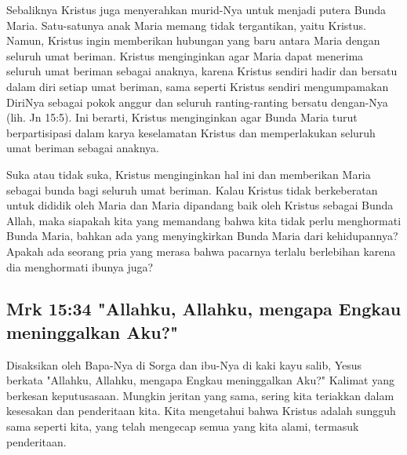 Sebaliknya Kristus juga menyerahkan murid-Nya untuk menjadi putera Bunda Maria.
Satu-satunya anak Maria memang tidak tergantikan, yaitu Kristus. Namun, Kristus
ingin memberikan hubungan yang baru antara Maria dengan seluruh umat beriman.
Kristus menginginkan agar Maria dapat menerima seluruh umat beriman sebagai
anaknya, karena Kristus sendiri hadir dan bersatu dalam diri setiap umat
beriman, sama seperti Kristus sendiri mengumpamakan DiriNya sebagai pokok
anggur dan seluruh ranting-ranting bersatu dengan-Nya (lih. Jn 15:5). Ini
berarti, Kristus menginginkan agar Bunda Maria turut berpartisipasi dalam karya
keselamatan Kristus dan memperlakukan seluruh umat beriman sebagai anaknya.

Suka atau tidak suka, Kristus menginginkan hal ini dan memberikan Maria sebagai
bunda bagi seluruh umat beriman. Kalau Kristus tidak berkeberatan untuk dididik
oleh Maria dan Maria dipandang baik oleh Kristus sebagai Bunda Allah, maka
siapakah kita yang memandang bahwa kita tidak perlu menghormati Bunda Maria,
bahkan ada yang menyingkirkan Bunda Maria dari kehidupannya? Apakah ada seorang
pria yang merasa bahwa pacarnya terlalu berlebihan karena dia menghormati
ibunya juga?

\subsection{Mrk 15:34 "Allahku, Allahku, mengapa Engkau meninggalkan Aku?"}
Disaksikan oleh Bapa-Nya di Sorga dan ibu-Nya di kaki kayu salib, Yesus berkata
"Allahku, Allahku, mengapa Engkau meninggalkan Aku?" Kalimat yang berkesan
keputusasaan. Mungkin jeritan yang sama, sering kita teriakkan dalam kesesakan
dan penderitaan kita. Kita mengetahui bahwa Kristus adalah sungguh sama seperti
kita, yang telah mengecap semua yang kita alami, termasuk penderitaan. 

